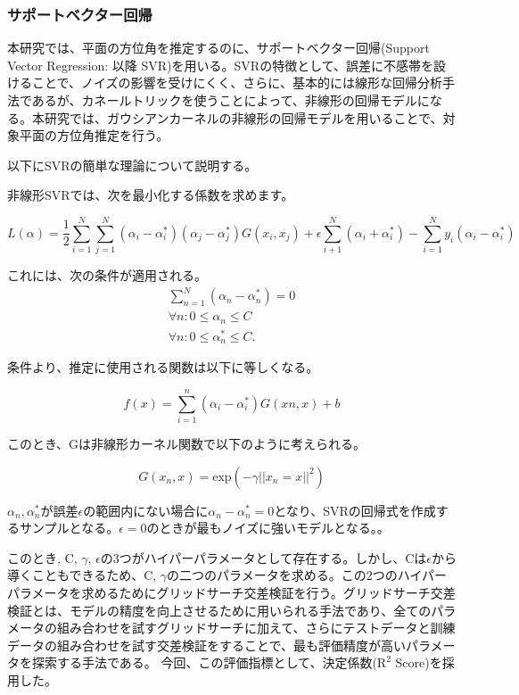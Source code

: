 \subsubsection{サポートベクター回帰}
\label{sec:support_vector_regression}
本研究では、平面の方位角を推定するのに、サポートベクター回帰(Support Vector Regression: 以降 SVR)を用いる。\cite{bishop2011prml}SVRの特徴として、誤差に不感帯を設けることで、ノイズの影響を受けにくく、さらに、基本的には線形な回帰分析手法であるが、カネールトリックを使うことによって、非線形の回帰モデルになる。本研究では、ガウシアンカーネルの非線形の回帰モデルを用いることで、対象平面の方位角推定を行う。

以下にSVRの簡単な理論について説明する。

非線形SVRでは、次を最小化する係数を求めます。

\begin{equation}
    L(\alpha) = \frac{1}{2}\sum^{N}_{i=1}\sum^{N}_{j=1}(\alpha_i - \alpha^{\ast}_i)(\alpha_j - \alpha^{\ast}_j)G(x_i, x_j) + \epsilon\sum^{N}_{i+1}(\alpha _i + \alpha^{\ast}_i) - \sum^{N}_{i=1}y_i(\alpha_i-\alpha^{\ast}_i)
\end{equation}

これには、次の条件が適用される。
\begin{equation}
    \begin{array}{l}
        \sum^{N}_{n=1} (\alpha_n - \alpha^{\ast}_n) = 0\\
        \forall n : 0 \le \alpha_n \le C\\
        \forall n : 0 \le \alpha^{\ast}_n \le C.
    \end{array}
\end{equation}

条件より、推定に使用される関数は以下に等しくなる。

\begin{equation}
    f(x) = \sum^{n}_{i=1}(\alpha_i - \alpha^{\ast}_i)G(x{n},x) + b
\end{equation}

このとき、Gは非線形カーネル関数で以下のように考えられる。

\begin{equation}
    G(x_n, x) = \mathrm{exp}(-\gamma||x_n=x||^{2})
\end{equation}

$\alpha_n, \alpha^{\ast}_n$が誤差$\epsilon$の範囲内にない場合に$\alpha_n - \alpha^{\ast}_n = 0$となり、SVRの回帰式を作成するサンプルとなる。$\epsilon = 0$のときが最もノイズに強いモデルとなる。。

このとき, C, $\gamma$, $\epsilon$の3つがハイパーパラメータとして存在する。しかし、Cは$\epsilon$から導くこともできるため、C, $\gamma$の二つのパラメータを求める。この2つのハイパーパラメータを求めるためにグリッドサーチ交差検証を行う。グリッドサーチ交差検証とは、モデルの精度を向上させるために用いられる手法であり、全てのパラメータの組み合わせを試すグリッドサーチに加えて、さらにテストデータと訓練データの組み合わせを試す交差検証をすることで、最も評価精度が高いパラメータを探索する手法である。
今回、この評価指標として、決定係数($\mathrm{R}^2$ Score)を採用した。

\clearpage
\newpage